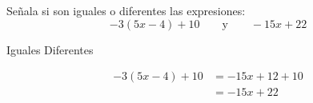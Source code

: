 

Señala si son iguales o diferentes las expresiones: \[-3(5x-4) + 10\qquad\text{y}\qquad-15x+22\]
\begin{oneparchoices}
    \CorrectChoice Iguales
    \choice Diferentes
\end{oneparchoices}
\begin{solutionbox}{2.5cm}
    \begin{align*}
        -3(5x-4) + 10 & =-15x+12+10 \\
                      & =-15x+22
    \end{align*}
\end{solutionbox}

